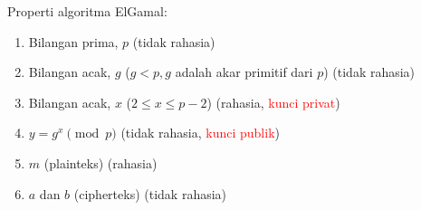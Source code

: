 \documentclass{article}
\begin{document}

Properti algoritma ElGamal:
\begin{enumerate}
  \item Bilangan prima, $p$ \hfill (tidak rahasia)
  \item Bilangan acak, $g$ ($g < p, g$ adalah akar primitif dari $p$) \hfill (tidak rahasia)
  \item Bilangan acak, $x$ ($2 \le x \le p - 2$) \hfill (rahasia, \textcolor{red}{kunci privat})
  \item $y = g^x \pmod{p}$ \hfill (tidak rahasia, \textcolor{red}{kunci publik})
  \item $m$ (plainteks) \hfill (rahasia)
  \item $a$ dan $b$ (cipherteks) \hfill (tidak rahasia)
\end{enumerate}
\end{document}
